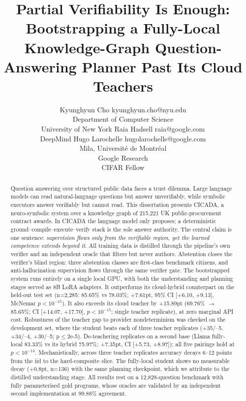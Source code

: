 \documentclass[10pt]{article} %
\title{Partial Verifiability Is Enough: Bootstrapping a Fully-Local\\
Knowledge-Graph Question-Answering Planner Past Its Cloud Teachers}
\author{\name Kyunghyun Cho \email kyunghyun.cho@nyu.edu \\
      \addr Department of Computer Science\\
      University of New York
      \AND
      \name Raia Hadsell \email raia@google.com \\
      \addr DeepMind
      \AND
      \name Hugo Larochelle \email hugolarochelle@google.com\\
      \addr Mila, Universit\'e de Montr\'eal \\
      Google Research\\
      CIFAR Fellow}
\begin{document}
\maketitle
\begin{abstract}

Question answering over structured public data faces a trust dilemma. Large language models can read natural-language questions but answer unverifiably, while symbolic executors answer verifiably but cannot read. This dissertation presents CICADA, a neuro-symbolic system over a knowledge graph of 215,221 UK public-procurement contract awards. In CICADA the language model only proposes; a deterministic ground--compile--execute--verify stack is the sole answer authority. The central claim is one sentence: \emph{supervision flows only from the verifiable region, yet the learned competence extends beyond it}. All training data is distilled through the pipeline's own verifier and an independent oracle that filters but never authors. Abstention closes the verifier's blind region: three abstention classes are first-class benchmark citizens, and anti-hallucination supervision flows through the same verifier gate. The bootstrapped system runs entirely on a single local GPU, with both the understanding and planning stages served as 8B LoRA adapters. It outperforms its cloud-hybrid counterpart on the held-out test set (n=2,285: 85.65\% vs 78.03\%; +7.61pt, 95\% CI [+6.10, +9.13], McNemar $p<10^{-15}$). It also exceeds its cloud teacher by +15.89pt (69.76\% $\rightarrow$ 85.65\%; CI [+14.07, +17.70], $p<10^{-15}$; single teacher replicate), at zero marginal API cost. Robustness of the teacher gap to provider nondeterminism was checked on the development set, where the student beats each of three teacher replicates (+35/--5, +34/--4, +30/--5; p$\leq$2e-5). De-teachering replicates on a second base (Llama fully-local 83.33\% vs its hybrid 75.97\%; +7.35pt, CI [+5.73, +8.97]); all five pairings hold at $p<10^{-14}$. Mechanistically, across three teacher replicates accuracy decays 6--12 points from the iid to the hard-composite slice. The fully-local student shows no measurable decay (+0.8pt, n=136) with the same planning checkpoint, which we attribute to the distilled understanding stage. All results rest on a 12,828-question benchmark with fully parameterised gold programs, whose oracles are validated by an independent second implementation at 99.88\% agreement.
\end{abstract}

\end{document}
